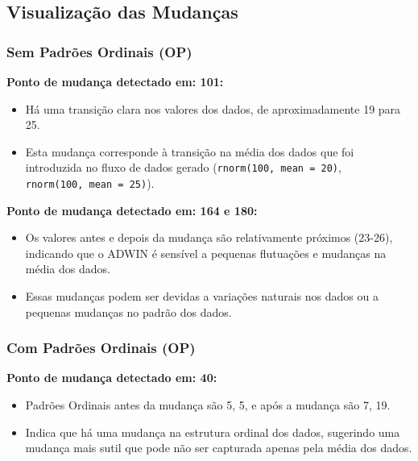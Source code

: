 \documentclass[
]{article}
\providecommand{\tightlist}{%
  \setlength{\itemsep}{0pt}\setlength{\parskip}{0pt}}
\begin{document}
\hypertarget{visualizauxe7uxe3o-das-mudanuxe7as}{%
\subsection{Visualização das
Mudanças}\label{visualizauxe7uxe3o-das-mudanuxe7as}}

\hypertarget{sem-padruxf5es-ordinais-op}{%
\subsubsection{Sem Padrões Ordinais
(OP)}\label{sem-padruxf5es-ordinais-op}}

\textbf{Ponto de mudança detectado em: 101:}

\begin{itemize}
\tightlist
\item
  Há uma transição clara nos valores dos dados, de aproximadamente 19
  para 25.
\item
  Esta mudança corresponde à transição na média dos dados que foi
  introduzida no fluxo de dados gerado
  (\texttt{rnorm(100,\ mean\ =\ 20)},
  \texttt{rnorm(100,\ mean\ =\ 25)}).
\end{itemize}

\textbf{Ponto de mudança detectado em: 164 e 180:}

\begin{itemize}
\tightlist
\item
  Os valores antes e depois da mudança são relativamente próximos
  (23-26), indicando que o ADWIN é sensível a pequenas flutuações e
  mudanças na média dos dados.
\item
  Essas mudanças podem ser devidas a variações naturais nos dados ou a
  pequenas mudanças no padrão dos dados.
\end{itemize}

\hypertarget{com-padruxf5es-ordinais-op}{%
\subsubsection{Com Padrões Ordinais
(OP)}\label{com-padruxf5es-ordinais-op}}

\textbf{Ponto de mudança detectado em: 40:}

\begin{itemize}
\tightlist
\item
  Padrões Ordinais antes da mudança são 5, 5, e após a mudança são 7,
  19.
\item
  Indica que há uma mudança na estrutura ordinal dos dados, sugerindo
  uma mudança mais sutil que pode não ser capturada apenas pela média
  dos dados.
\end{itemize}
\end{document}
